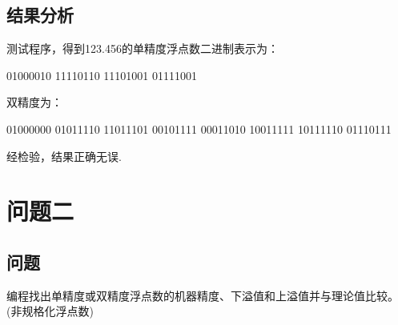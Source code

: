 \documentclass[UTF8,ctexart,a4paper,11pt,openany]{article}
\theoremstyle{definition}
\begin{document}
    \subsection{结果分析}%
    测试程序，得到123.456的单精度浮点数二进制表示为：\par 01000010 11110110 11101001 01111001 \par 双精度为：\par 01000000 01011110 11011101 00101111 00011010 10011111 10111110 01110111 \par
    经检验，结果正确无误.
    
\section{问题二} 
    \subsection{问题}
    编程找出单精度或双精度浮点数的机器精度、下溢值和上溢值并与理论值比较。(非规格化浮点数)
\end{document}
